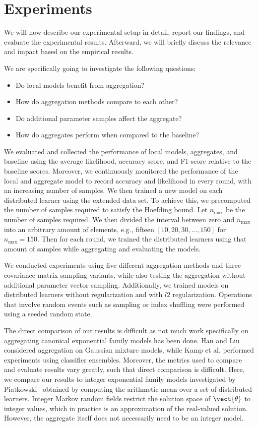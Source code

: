 
\chapter{Experiments}
\label{chapter:ch5}
We will now describe our experimental setup in detail, report our findings, and evaluate the experimental results.
Afterward, we will briefly discuss the relevance and impact based on the empirical results.

We are specifically going to investigate the following questions:
\begin{itemize}
    \item Do local models benefit from aggregation?
    \item How do aggregation methods compare to each other? 
    \item Do additional parameter samples affect the aggregate?
    \item How do aggregates perform when compared to the baseline?
\end{itemize}
We evaluated and collected the performance of local models, aggregates, and baseline using the average likelihood, accuracy score, and F1-score relative to the baseline scores. 
Moreover, we continuously monitored the performance of the local and aggregate model to record accuracy and likelihood in every round, with an increasing number of samples.
We then trained a new model on each distributed learner using the extended data set.
To achieve this, we precomputed the number of samples required to satisfy the Hoefding bound. 
Let $n_{\max}$ be the number of samples required.
We then divided the interval between zero and $n_{\max}$ into an arbitrary amount of elements, e.g., fifteen $[10,20,30, \ldots, 150]$ for $n_{\max} = 150$. 
Then for each round, we trained the distributed learners using that amount of samples while aggregating and evaluating the models.
 
We conducted experiments using five different aggregation methods and three covariance matrix sampling variants, while also testing the aggregation without additional parameter vector sampling.
Additionally, we trained models on distributed learners without regularization and with $l2$ regularization.
Operations that involve random events such as sampling or index shuffling were performed using a seeded random state.

The direct comparison of our results is difficult as not much work specifically on aggregating canonical exponential family models has been done. Han and Liu~\cite{han2016bootstrap} considered aggregation on Gaussian mixture models, while Kamp et al. \cite{kamp2017effective} performed experiments using classifier ensembles.
Moreover, the metrics used to compare and evaluate results vary greatly, such that direct comparison is difficult.
Here, we compare our results to integer exponential family models investigated by Piatkowski~\cite{piatkowski2018exponential} obtained by computing the arithmetic mean over a set of distributed learners. 
Integer Markov random fields restrict the solution space of $\vect{\theta}$ to integer values, which in practice is an approximation of the real-valued solution.
However, the aggregate itself does not necessarily need to be an integer model.

